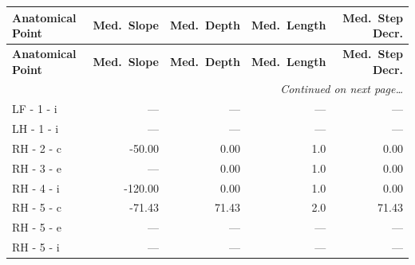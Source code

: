 \documentclass[a4paper,11pt]{article}
\begin{document}
\begin{small}
\begin{longtable}{p{4.5cm}rrrr}
\toprule
\textbf{Anatomical Point} &
\textbf{Med.\ Slope} &
\textbf{Med.\ Depth} &
\textbf{Med.\ Length} &
\textbf{Med.\ Step Decr.} \\
\midrule
\endfirsthead
\toprule
\textbf{Anatomical Point} &
\textbf{Med.\ Slope} &
\textbf{Med.\ Depth} &
\textbf{Med.\ Length} &
\textbf{Med.\ Step Decr.} \\
\midrule
\endhead
\midrule
\multicolumn{5}{r}{\small\emph{Continued on next page\ldots}} \\
\endfoot
\bottomrule
\endlastfoot
LF - 1 - i & --- & --- & --- & --- \\
LH - 1 - i & --- & --- & --- & --- \\
RH - 2 - c & -50.00 & 0.00 & 1.0 & 0.00 \\
RH - 3 - e & --- & 0.00 & 1.0 & 0.00 \\
RH - 4 - i & -120.00 & 0.00 & 1.0 & 0.00 \\
RH - 5 - c & -71.43 & 71.43 & 2.0 & 71.43 \\
RH - 5 - e & --- & --- & --- & --- \\
RH - 5 - i & --- & --- & --- & --- \\
\end{longtable}
\end{small}
\end{document}
